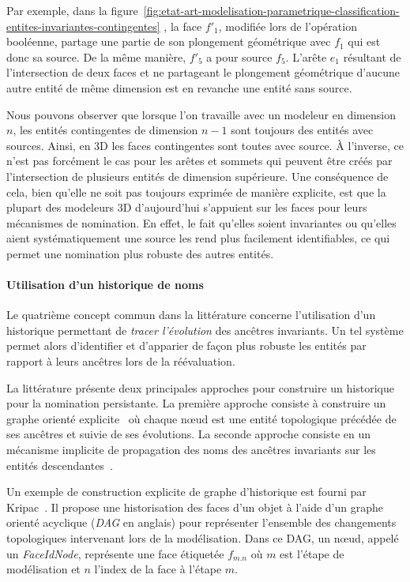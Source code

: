 Par exemple, dans la
figure~\ref{fig:etat-art-modelisation-parametrique-classification-entites-invariantes-contingentes}
, la face $f'_{1}$, modifiée lors de l'opération booléenne, partage une partie
de son plongement géométrique avec $f_{1}$ qui est donc sa source. %
De la même manière, $f'_{5}$ a pour source $f_{5}$. %
L'arête $e_1$ résultant de l'intersection de deux faces et ne partageant le
plongement géométrique d'aucune autre entité de même dimension est en revanche
une entité sans source. %

Nous pouvons observer que lorsque l'on travaille avec un modeleur en dimension
$n$, les entités contingentes de dimension $n-1$ sont toujours des entités avec sources. %
Ainsi, en 3D les faces contingentes sont toutes avec source. %
À l'inverse, ce n'est pas forcément le cas pour les arêtes et sommets qui
peuvent être créés par l'intersection de plusieurs entités de dimension
supérieure. %
Une conséquence de cela, bien qu'elle ne soit pas toujours exprimée de manière explicite, est que la plupart des modeleurs 3D d'aujourd'hui s'appuient sur les faces pour leurs mécanismes de nomination. %
En effet, le fait qu'elles soient invariantes ou qu'elles aient systématiquement une source les rend plus facilement identifiables, ce qui permet une nomination plus robuste des autres entités.

\paragraph*{Utilisation d'un historique de noms}

Le quatrième concept commun dans la littérature concerne l'utilisation d'un
historique permettant de \textit{tracer l'évolution} des ancêtres invariants. %
Un tel système permet alors d'identifier et d'apparier de façon plus robuste les
entités par rapport à leurs ancêtres lors de la réévaluation. %

La littérature présente deux principales approches pour construire un historique
pour la nomination persistante. %
La première approche consiste à construire un graphe orienté
explicite~\cite{kripac1995mechanism,agbodan2000persistent,baba2007generic,cardot2019persistent}
où chaque n\oe ud est une entité topologique précédée de ses ancêtres et suivie de
ses évolutions. %
La seconde approche consiste en un mécanisme implicite de propagation des noms
des ancêtres invariants sur les entités descendantes~\cite{CAPOYLEAS199617,wu2001face}. %

Un exemple de construction explicite de graphe d'historique est  fourni
par Kripac~\cite{kripac1995mechanism}. Il propose une historisation des faces
d'un objet à l'aide d'un graphe orienté acyclique (\emph{DAG} en anglais) pour
représenter l'ensemble des changements topologiques intervenant lors de la
modélisation. %
Dans ce DAG, un n\oe ud, appelé un \textit{FaceIdNode}, représente une face
étiquetée $f_{m.n}$ où $m$ est l'étape de modélisation et $n$ l'index de la face
à l'étape $m$. %

